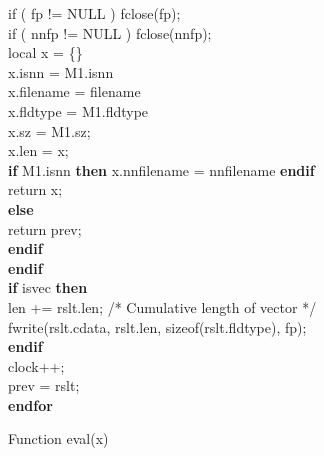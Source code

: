 \begin{figure}
{\begin{minipage}{20cm}
\begin{tabbing}
      if ( fp != NULL ) { fclose(fp); } \\
      if ( nnfp != NULL ) { fclose(nnfp); } \\
      local x = \{\} \\
      x.isnn = M1.isnn \\
      x.filename = filename \\
      x.fldtype = M1.fldtype \\
      x.sz = M1.sz; \\
      x.len = x; \\
      {\bf if } M1.isnn {\bf then} x.nnfilename = nnfilename {\bf endif} \\
      return x; \- \\
    {\bf else}  \+ \\ 
      return prev; \- \\
    {\bf endif} \- \\
  {\bf endif} \\
  {\bf if} isvec {\bf then} \+ \\
    len += rslt.len; /* Cumulative length of vector */ \\
    fwrite(rslt.cdata, rslt.len, sizeof(rslt.fldtype), fp); \- \\
  {\bf endif} \\ 
  clock++; \\
  prev = rslt; \- \\
{\bf endfor}
\end{tabbing}
\end{minipage}
}
\label{eval}
\caption{Function eval(x)}
\end{figure}

